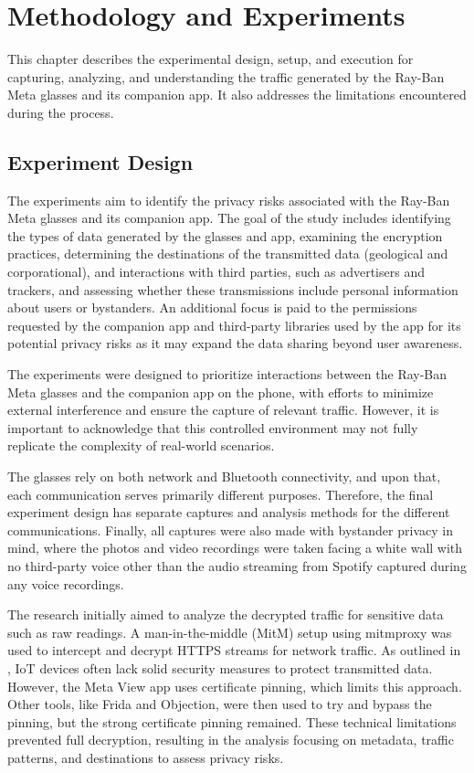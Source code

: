 \chapter{Methodology and Experiments}  
\label{chap:methodologyExperiment}

This chapter describes the experimental design, setup, and execution for capturing, analyzing, and understanding the traffic generated by the Ray-Ban Meta glasses and its companion app. It also addresses the limitations encountered during the process.

\section{Experiment Design}
The experiments aim to identify the privacy risks associated with the Ray-Ban Meta glasses and its companion app. The goal of the study includes identifying the types of data generated by the glasses and app, examining the encryption practices, determining the destinations of the transmitted data (geological and corporational), and interactions with third parties, such as advertisers and trackers, and assessing whether these transmissions include personal information about users or bystanders. An additional focus is paid to the permissions requested by the companion app and third-party libraries used by the app for its potential privacy risks as it may expand the data sharing beyond user awareness. 

The experiments were designed to prioritize interactions between the Ray-Ban Meta glasses and the companion app on the phone, with efforts to minimize external interference and ensure the capture of relevant traffic. However, it is important to acknowledge that this controlled environment may not fully replicate the complexity of real-world scenarios. 

The glasses rely on both network and Bluetooth connectivity, and upon that, each communication serves primarily different purposes. Therefore, the final experiment design has separate captures and analysis methods for the different communications. Finally, all captures were also made with bystander privacy in mind, where the photos and video recordings were taken facing a white wall with no third-party voice other than the audio streaming from Spotify captured during any voice recordings. 

The research initially aimed to analyze the decrypted traffic for sensitive data such as raw readings. A man-in-the-middle (MitM) setup using mitmproxy was used to intercept and decrypt HTTPS streams for network traffic. As outlined in \cite{fereidouni2023iotmaninthemiddleattacks}, IoT devices often lack solid security measures to protect transmitted data. However, the Meta View app uses certificate pinning, which limits this approach. Other tools, like Frida and Objection, were then used to try and bypass the pinning, but the strong certificate pinning remained. These technical limitations prevented full decryption, resulting in the analysis focusing on metadata, traffic patterns, and destinations to assess privacy risks.


